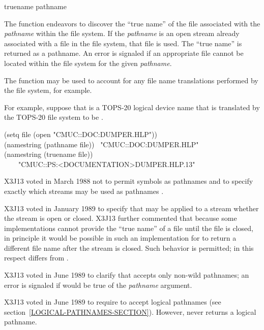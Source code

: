 \begin{defun}[Function]
truename pathname

The  function
endeavors to discover the ``true name'' of the file
associated with the {\it pathname} within the file system.
If the {\it pathname} is an open stream already associated with a file
in the file system, that file is used.
The ``true name'' is returned as a pathname.
An error is signaled if an appropriate file cannot be located
within the file system for the given {\it pathname}.

The  function may be used to
account for any file name translations performed by the file system,
for example.

For example, suppose that  is a {TOPS-20} logical
device name that is translated by the {TOPS-20} file system
to be .
\begin{lisp}
(setq file (open "CMUC::DOC:DUMPER.HLP")) \\
(namestring (pathname file)) \EV\ "CMUC::DOC:DUMPER.HLP" \\
(namestring (truename file)) \\
~~~\EV\ "CMUC::PS:<DOCUMENTATION>DUMPER.HLP.13"
\end{lisp}

\begin{new}
X3J13 voted in March 1988
not to permit symbols as pathnames
 and
to specify exactly which streams may be used as pathnames
.
\end{new}

\begin{new}
X3J13 voted in January 1989
to specify that  may be
applied to a stream whether the stream is open or closed.
X3J13 further commented that because some implementations cannot
provide the ``true name'' of a file until the file is closed, in principle
it would be possible in such an implementation for  to
return a different file name after the stream is closed.
Such behavior is permitted; in this respect 
differs from .
\end{new}

\begin{newer}
X3J13 voted in June 1989 
to clarify that  accepts only non-wild pathnames;
an error is signaled if  would be true of
the {\it pathname} argument.
\end{newer}

\begin{newer}
X3J13 voted in June 1989  to require 
to accept logical pathnames (see section~\ref{LOGICAL-PATHNAMES-SECTION}).
However,  never returns a logical pathname.
\end{newer}
\end{defun}

